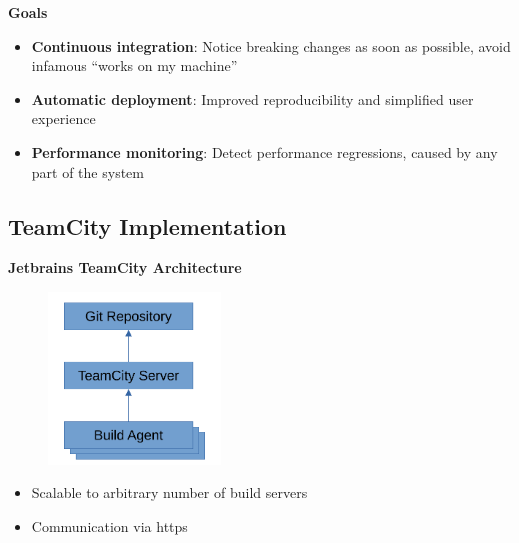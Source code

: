 \documentclass[english,xcolor=pst,11pt]{beamer}
\begin{document}
\begin{frame}

\textbf{Goals}
\begin{itemize}
 \item \textbf{Continuous integration}: Notice breaking changes as soon as possible, avoid infamous ``works on my machine''
 \item \textbf{Automatic deployment}: Improved reproducibility and simplified user experience
 \item \textbf{Performance monitoring}: Detect performance regressions, caused by any part of the system
\end{itemize}

\end{frame}

\begin{frame}

\section{TeamCity Implementation}
\textbf{Jetbrains TeamCity Architecture}
\begin{figure}[H]
	\centering
    {\includegraphics[width=1.8in]{diagrams/teamcity.pdf}}
\end{figure}
\vfill
\begin{itemize}
 \item Scalable to arbitrary number of build servers
 \item Communication via https
\end{itemize}




\end{frame}
\end{document}
